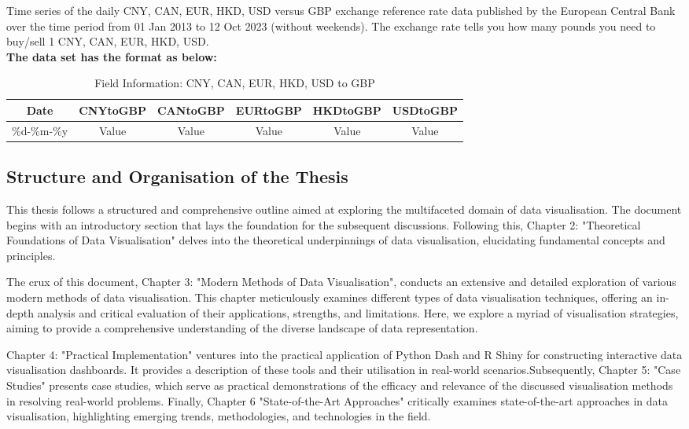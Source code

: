\documentclass{article}\usepackage[]{graphicx}\usepackage[]{xcolor}
\begin{document}
\begin{enumerate}
Time series of the daily CNY, CAN, EUR, HKD, USD versus GBP exchange reference rate data
published by the European Central Bank over the time period from 01 Jan 2013 to 12 Oct 2023 (without weekends). The exchange rate tells you how many pounds you need to buy/sell 1 CNY, CAN, EUR, HKD, USD.\\

\textbf{The data set has the format as below:}\\

\begin{table}[h]
\centering
\begin{tabular}{|c|c|c|c|c|c|}
\hline
\textbf{Date} & \textbf{CNYtoGBP} & \textbf{CANtoGBP} & \textbf{EURtoGBP} & \textbf{HKDtoGBP} & \textbf{USDtoGBP} \\
\hline
\%d-\%m-\%y & Value & Value & Value & Value & Value \\
\hline
\end{tabular}
\caption{Field Information: CNY, CAN, EUR, HKD, USD to GBP}
\end{table}

\end{enumerate}


\subsection{Structure and Organisation of the Thesis}
This thesis follows a structured and comprehensive outline aimed at exploring the multifaceted domain of data visualisation. The document begins with an introductory section that lays the foundation for the subsequent discussions. Following this, Chapter 2: "Theoretical Foundations of Data Visualisation" delves into the theoretical underpinnings of data visualisation, elucidating fundamental concepts and principles.

The crux of this document, Chapter 3: "Modern Methods of Data Visualisation", conducts an extensive and detailed exploration of various modern methods of data visualisation. This chapter meticulously examines different types of data visualisation techniques, offering an in-depth analysis and critical evaluation of their applications, strengths, and limitations. Here, we explore a myriad of visualisation strategies, aiming to provide a comprehensive understanding of the diverse landscape of data representation.

Chapter 4: "Practical Implementation" ventures into the practical application of Python Dash and R Shiny for constructing interactive data visualisation dashboards. It provides a description of these tools and their utilisation in real-world scenarios.Subsequently, Chapter 5: "Case Studies" presents case studies, which serve as practical demonstrations of the efficacy and relevance of the discussed visualisation methods in resolving real-world problems. Finally, Chapter 6 "State-of-the-Art Approaches" critically examines state-of-the-art approaches in data visualisation, highlighting emerging trends, methodologies, and technologies in the field.
\end{document}
